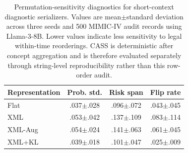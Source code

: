 \begin{table}[t]
\caption{Permutation-sensitivity diagnostics for short-context diagnostic serializers. Values are mean$\pm$standard deviation across three seeds and 500 MIMIC-IV audit records using Llama-3-8B. Lower values indicate less sensitivity to legal within-time reorderings. CASS is deterministic after concept aggregation and is therefore evaluated separately through string-level reproducibility rather than this row-order audit.}
\label{tab:permutation_diagnostics}
\centering
\scriptsize
\setlength{\tabcolsep}{4.0pt}
\begin{tabular}{lccc}
\toprule
Representation & Prob. std. & Risk span & Flip rate \\
\midrule
Flat & .037$\pm$.028 & .096$\pm$.072 & .043$\pm$.045 \\
XML & .053$\pm$.042 & .137$\pm$.109 & .083$\pm$.114 \\
XML-Aug & .054$\pm$.024 & .141$\pm$.063 & .061$\pm$.045 \\
XML+KL & .039$\pm$.018 & .101$\pm$.047 & .025$\pm$.009 \\
\bottomrule
\end{tabular}
\end{table}

